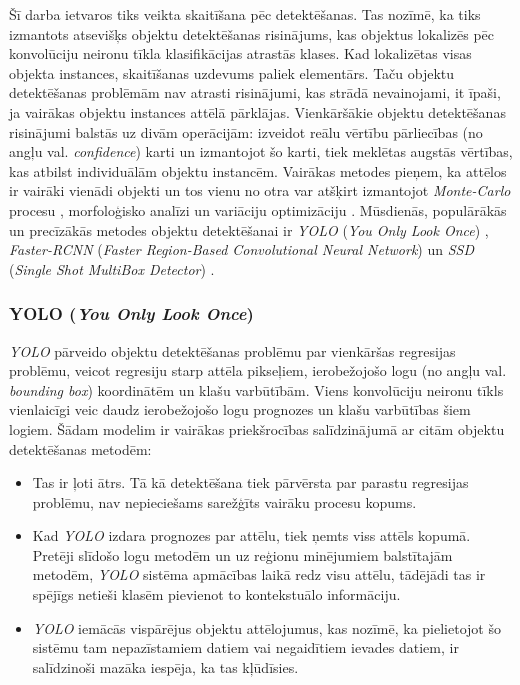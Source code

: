 Šī darba ietvaros tiks veikta skaitīšana pēc detektēšanas. Tas nozīmē, ka tiks izmantots atsevišķs objektu detektēšanas risinājums, kas objektus lokalizēs pēc konvolūciju neironu tīkla klasifikācijas atrastās klases. Kad lokalizētas visas objekta instances, skaitīšanas uzdevums paliek elementārs. Taču objektu detektēšanas problēmām nav atrasti risinājumi, kas strādā nevainojami, it īpaši, ja vairākas objektu instances attēlā pārklājas. Vienkāršākie objektu detektēšanas risinājumi balstās uz divām operācijām: izveidot reālu vērtību pārliecības (no angļu val. \textit{confidence}) karti un izmantojot šo karti, tiek meklētas augstās vērtības, kas atbilst individuālām objektu instancēm. Vairākas metodes pieņem, ka attēlos ir vairāki vienādi objekti un tos vienu no otra var atšķirt izmantojot \textit{Monte-Carlo} procesu \cite{descombes2009object}, morfoloģisko analīzi \cite{selinummi2005software} un variāciju optimizāciju \cite{nath2006cell}. Mūsdienās, populārākās un precīzākās metodes objektu detektēšanai ir \textit{YOLO} (\textit{You Only Look Once}) \cite{redmon2016you}, \textit{Faster-RCNN} (\textit{Faster Region-Based Convolutional Neural Network}) \cite{ren2015faster} un \textit{SSD} (\textit{Single Shot MultiBox Detector}) \cite{liu2016ssd}.
\subsubsection{YOLO (\textit{You Only Look Once})}
\textit{YOLO} pārveido objektu detektēšanas problēmu par vienkāršas regresijas problēmu, veicot regresiju starp attēla pikseļiem, ierobežojošo logu (no angļu val. \textit{bounding box}) koordinātēm un klašu varbūtībām. Viens konvolūciju neironu tīkls vienlaicīgi veic daudz ierobežojošo logu prognozes un klašu varbūtības šiem logiem. Šādam modelim ir vairākas priekšrocības salīdzinājumā ar citām objektu detektēšanas metodēm: 
\begin{itemize}
	\item Tas ir ļoti ātrs. Tā kā detektēšana tiek pārvērsta par parastu regresijas problēmu, nav nepieciešams sarežģīts vairāku procesu kopums. 
	\item Kad \textit{YOLO} izdara prognozes par attēlu, tiek ņemts viss attēls kopumā. Pretēji slīdošo logu metodēm un uz reģionu minējumiem balstītajām metodēm, \textit{YOLO} sistēma apmācības laikā redz visu attēlu, tādējādi tas ir spējīgs netieši klasēm pievienot to kontekstuālo informāciju.
	\item \textit{YOLO} iemācās vispārējus objektu attēlojumus, kas nozīmē, ka pielietojot šo sistēmu tam nepazīstamiem datiem vai negaidītiem ievades datiem, ir salīdzinoši mazāka iespēja, ka tas kļūdīsies. 
\end{itemize}

